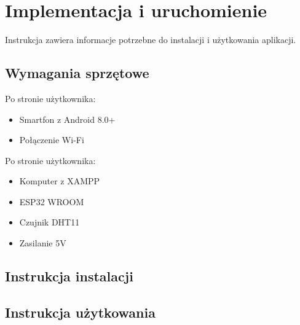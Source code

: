 \chapter{Implementacja i uruchomienie}
Instrukcja zawiera informacje potrzebne do instalacji i użytkowania aplikacji.

\section{Wymagania sprzętowe}
Po stronie użytkownika:
\begin{itemize}
	\item Smartfon z Android 8.0+
	\item Połączenie Wi-Fi
\end{itemize}

Po stronie użytkownika:
\begin{itemize}
	\item Komputer z XAMPP
	\item ESP32 WROOM
	\item Czujnik DHT11
	\item Zasilanie 5V
\end{itemize}

\section{Instrukcja instalacji}

\section{Instrukcja użytkowania}

